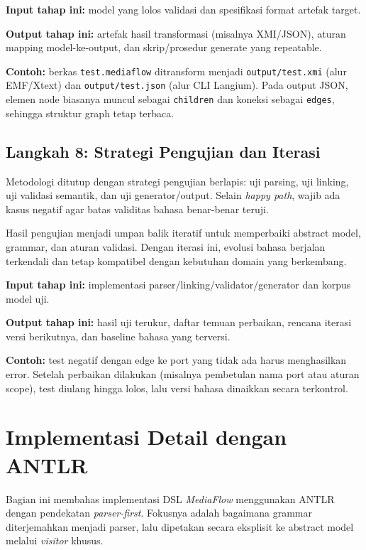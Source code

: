 \textbf{Input tahap ini:} model yang lolos validasi dan spesifikasi format artefak target.

\textbf{Output tahap ini:} artefak hasil transformasi (misalnya XMI/JSON), aturan mapping model-ke-output, dan skrip/prosedur generate yang repeatable.

\textbf{Contoh:} berkas \texttt{test.mediaflow} ditransform menjadi \texttt{output/test.xmi} (alur EMF/Xtext) dan \texttt{output/test.json} (alur CLI Langium). Pada output JSON, elemen node biasanya muncul sebagai \texttt{children} dan koneksi sebagai \texttt{edges}, sehingga struktur graph tetap terbaca.

\subsection{Langkah 8: Strategi Pengujian dan Iterasi}

Metodologi ditutup dengan strategi pengujian berlapis: uji parsing, uji linking, uji validasi semantik, dan uji generator/output. Selain \textit{happy path}, wajib ada kasus negatif agar batas validitas bahasa benar-benar teruji.

Hasil pengujian menjadi umpan balik iteratif untuk memperbaiki abstract model, grammar, dan aturan validasi. Dengan iterasi ini, evolusi bahasa berjalan terkendali dan tetap kompatibel dengan kebutuhan domain yang berkembang.

\textbf{Input tahap ini:} implementasi parser/linking/validator/generator dan korpus model uji.

\textbf{Output tahap ini:} hasil uji terukur, daftar temuan perbaikan, rencana iterasi versi berikutnya, dan baseline bahasa yang terversi.

\textbf{Contoh:} test negatif dengan edge ke port yang tidak ada harus menghasilkan error. Setelah perbaikan dilakukan (misalnya pembetulan nama port atau aturan scope), test diulang hingga lolos, lalu versi bahasa dinaikkan secara terkontrol.

\section{Implementasi Detail dengan ANTLR}

Bagian ini membahas implementasi DSL \textit{MediaFlow} menggunakan ANTLR dengan pendekatan \textit{parser-first}. Fokusnya adalah bagaimana grammar diterjemahkan menjadi parser, lalu dipetakan secara eksplisit ke abstract model melalui \textit{visitor} khusus.

